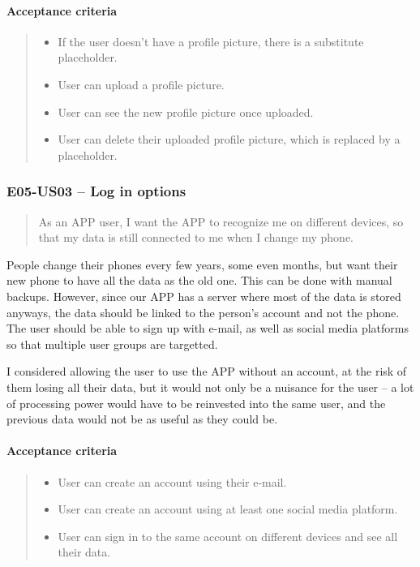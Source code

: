 \paragraph*{Acceptance criteria}
\begin{quote}
\begin{itemize}
    \item If the user doesn't have a profile picture, there is a substitute placeholder.
    \item User can upload a profile picture.
    \item User can see the new profile picture once uploaded.
    \item User can delete their uploaded profile picture, which is replaced by a placeholder.
\end{itemize}
\end{quote}

\subsubsection*{E05-US03 -- Log in options}
\begin{quote}
As an APP user, I want the APP to recognize me on different devices, so that my data is still connected to me when I change my phone.
\end{quote}

People change their phones every few years, some even months, but want their new phone to have all the data as the old one.
This can be done with manual backups.
However, since our APP has a server where most of the data is stored anyways, the data should be linked to the person's account and not the phone.
The user should be able to sign up with e-mail, as well as social media platforms so that multiple user groups are targetted.

I considered allowing the user to use the APP without an account, at the risk of them losing all their data, but it would not only be a nuisance for the user --
a lot of processing power would have to be reinvested into the same user, and the previous data would not be as useful as they could be.

\paragraph*{Acceptance criteria}
\begin{quote}
\begin{itemize}
    \item User can create an account using their e-mail.
    \item User can create an account using at least one social media platform.
    \item User can sign in to the same account on different devices and see all their data.
\end{itemize}
\end{quote}

